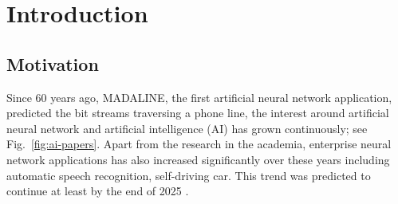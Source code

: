 \section{Introduction}

\subsection{Motivation}


Since 60 years ago, MADALINE\cite{adaline}, the first artificial neural network application, predicted the bit streams traversing a phone line, the interest around artificial neural network and artificial intelligence (AI) has grown continuously; see Fig.~\ref{fig:ai-papers}. Apart from the research in the academia, enterprise neural network applications has also increased significantly over these years including automatic speech recognition\cite{yu2016automatic}, self-driving car\cite{maqueda2018event}. This trend was predicted to continue at least by the end of 2025 \cite{ai-invest}. \\

